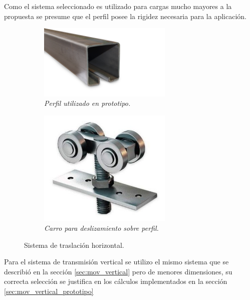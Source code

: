 Como el sistema seleccionado es utilizado para cargas mucho mayores a la propuesta se presume que el perfil posee la rigidez necesaria para la aplicación.\\
\begin{figure}[H]
    \centering
    \begin{subfigure}{0.48\textwidth}
        \centering
        \includegraphics[width=0.7\textwidth]{img/perfil_porton.png}
        \caption{\textit{Perfil utilizado en prototipo.}}
        \label{fig:perfil_porton}
    \end{subfigure}
    \hfill
    \begin{subfigure}{0.5\textwidth}
        \centering
        \includegraphics[width=0.7\textwidth]{img/carro_porton.png}
        \caption{\textit{Carro para deslizamiento sobre perfil.}}
        \label{fig:carro_porton}
    \end{subfigure}
    \caption{Sistema de traslación horizontal.}
\end{figure}
Para el sistema de transmisión vertical se utilizo el mismo sistema que se describió en la sección \ref{sec:mov_vertical} pero de menores dimensiones, su correcta selección se justifica en los cálculos implementados en la sección \ref{sec:mov_vertical_prototipo}
